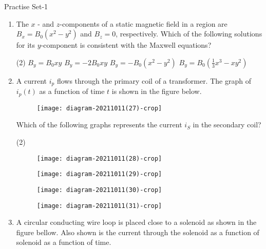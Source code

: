 \newpage
\begin{abox}
	Practise Set-1
\end{abox}
\begin{enumerate}
	\item The $x$ - and $z$-components of a static magnetic field in a region are $B_{x}=B_{0}\left(x^{2}-y^{2}\right)$ and $B_{z}=0$, respectively. Which of the following solutions for its $y$-component is consistent with the Maxwell equations?
	{}
	\begin{tasks}(2)
		\task[\textbf{a.}]$B_{y}=B_{0} x y$
		\task[\textbf{b.}]$B_{y}=-2 B_{0} x y$
		\task[\textbf{c.}] $B_{y}=-B_{0}\left(x^{2}-y^{2}\right)$
		\task[\textbf{d.}]  $B_{y}=B_{0}\left(\frac{1}{3} x^{3}-x y^{2}\right)$
	\end{tasks}
	\item A current $i_{p}$ flows through the primary coil of a transformer. The graph of $i_{p}(t)$ as a function of time $t$ is shown in the figure below.\\
	\begin{figure}[H]
		\centering
		\texttt{[image: diagram-20211011(27)-crop]}
	\end{figure}
	Which of the following graphs represents the current $i_{S}$ in the secondary coil?
	{}
	\begin{tasks}(2)
		\task[\textbf{A.}] \begin{figure}[H]
			\centering
			\texttt{[image: diagram-20211011(28)-crop]}
		\end{figure}
		\task[\textbf{B.}] \begin{figure}[H]
			\centering
			\texttt{[image: diagram-20211011(29)-crop]}
		\end{figure}
		\task[\textbf{C.}] \begin{figure}[H]
			\centering
			\texttt{[image: diagram-20211011(30)-crop]}
		\end{figure}
		\task[\textbf{D.}] \begin{figure}[H]
			\centering
			\texttt{[image: diagram-20211011(31)-crop]}
		\end{figure}
	\end{tasks}
	\item A circular conducting wire loop is placed close to a solenoid as shown in the figure bellow. Also shown is the current through the solenoid as a function of solenoid as a function of time.\\

\end{enumerate}
